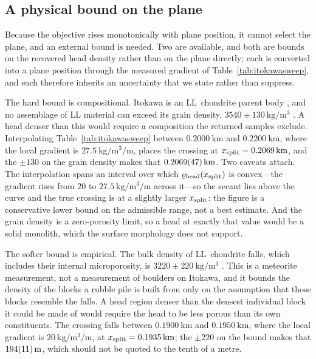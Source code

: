 \subsection{A physical bound on the plane}
\label{sec:itokawa:ceiling}

Because the objective rises monotonically with plane position, it cannot
select the plane, and an external bound is needed. Two are available, and
both are bounds on the recovered head density rather than on the plane
directly; each is converted into a plane position through the measured
gradient of Table~\ref{tab:itokawasweep}, and each therefore inherits an
uncertainty that we state rather than suppress.

The hard bound is compositional. Itokawa is an LL~chondrite parent body
\citep{nakamura2011}, and no assemblage of LL material can exceed its
grain density, $3540 \pm \SI{130}{\kilo\gram\per\cubic\metre}$
\citep{consolmagno2008}. A head denser than this would require a
composition the returned samples exclude. Interpolating
Table~\ref{tab:itokawasweep} between $\SI{0.2000}{\kilo\metre}$ and
$\SI{0.2200}{\kilo\metre}$, where the local gradient is
$\SI{27.5}{\kilo\gram\per\cubic\metre\per\metre}$, places the crossing at
$x_{\mathrm{split}} = \SI{0.2069}{\kilo\metre}$, and the $\pm130$ on the grain
density makes that $\SI{0.2069+-0.0047}{\kilo\metre}$. Two caveats
attach. The interpolation spans an interval over which
$\varrho_{\mathrm{head}}(x_{\mathrm{split}})$ is convex---the gradient rises from $20$ to
$\SI{27.5}{\kilo\gram\per\cubic\metre\per\metre}$ across it---so the
secant lies above the curve and the true crossing is at a slightly larger
$x_{\mathrm{split}}$: the figure is a conservative lower bound on the admissible
range, not a best estimate. And the grain density is a zero-porosity
limit, so a head at exactly that value would be a solid monolith, which
the surface morphology does not support.

The softer bound is empirical. The bulk density of LL~chondrite falls,
which includes their internal microporosity, is
$3220 \pm \SI{220}{\kilo\gram\per\cubic\metre}$ \citep{consolmagno2008}.
This is a meteorite measurement, not a measurement of boulders on Itokawa,
and it bounds the density of the blocks a rubble pile is built from only on
the assumption that those blocks resemble the falls.
A head region denser than the densest individual block it could be made
of would require the head to be less porous than its own constituents.
The crossing falls between $\SI{0.1900}{\kilo\metre}$ and
$\SI{0.1950}{\kilo\metre}$, where the local gradient is
$\SI{20}{\kilo\gram\per\cubic\metre\per\metre}$, at
$x_{\mathrm{split}} = \SI{0.1935}{\kilo\metre}$; the $\pm220$ on the bound makes
that $\SI{194+-11}{\metre}$, which should not be quoted to the tenth of a
metre.

